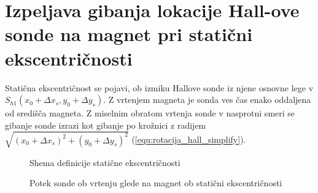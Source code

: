 \section{Izpeljava gibanja lokacije Hall-ove sonde na magnet pri statični ekscentričnosti}

Statična ekscentričnost se pojavi, ob izmiku Hallove sonde iz njene osnovne lege v  $S_{h1}(x_0+\Delta x_s, y_0+\Delta y_s)$. Z vrtenjem magneta je sonda ves čas enako oddaljena od središča magneta. Z miselnim obratom vrtenja sonde v nasprotni smeri se gibanje sonde izrazi kot gibanje po krožnici z radijem $\sqrt{(x_0+\Delta x_s)^2+(y_0+\Delta y_s)^2}$ (\ref{equ:rotacija_hall_simplify}).


\begin{figure}[h!]
	\centering
	\caption{Shema definicije statične ekscentričnosti}
	\label{fig:def_sta_eks}
\end{figure}



\begin{figure}[h!]
	\centering
	\caption{Potek sonde ob vrtenju glede na magnet ob statični ekscentričnosti}
	\label{fig:def_sta_eks_stat}
\end{figure}



